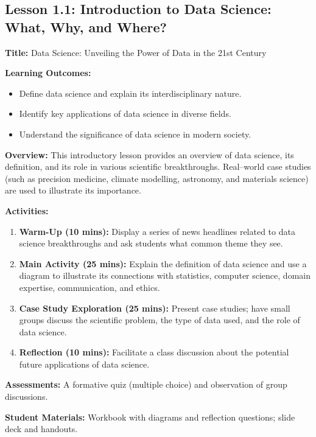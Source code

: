 \documentclass{tufte-book}
\begin{document}
\subsection{Lesson 1.1: Introduction to Data Science: What, Why, and Where?}
\textbf{Title:} Data Science: Unveiling the Power of Data in the 21st Century

\medskip
\textbf{Learning Outcomes:}
\begin{itemize}[leftmargin=*, label={\textbullet}]
    \item Define data science and explain its interdisciplinary nature.
    \item Identify key applications of data science in diverse fields.
    \item Understand the significance of data science in modern society.
\end{itemize}

\medskip
\textbf{Overview:}  
This introductory lesson provides an overview of data science, its definition, and its role in various scientific breakthroughs. Real--world case studies (such as precision medicine, climate modelling, astronomy, and materials science) are used to illustrate its importance.

\medskip
\textbf{Activities:}
\begin{enumerate}[label=\arabic*.]
    \item \textbf{Warm-Up (10 mins):} Display a series of news headlines related to data science breakthroughs and ask students what common theme they see.
    \item \textbf{Main Activity (25 mins):} Explain the definition of data science and use a diagram to illustrate its connections with statistics, computer science, domain expertise, communication, and ethics.
    \item \textbf{Case Study Exploration (25 mins):} Present case studies; have small groups discuss the scientific problem, the type of data used, and the role of data science.
    \item \textbf{Reflection (10 mins):} Facilitate a class discussion about the potential future applications of data science.
\end{enumerate}

\medskip
\textbf{Assessments:}  
A formative quiz (multiple choice) and observation of group discussions.

\medskip
\textbf{Student Materials:}  
Workbook with diagrams and reflection questions; slide deck and handouts.

\end{document}

